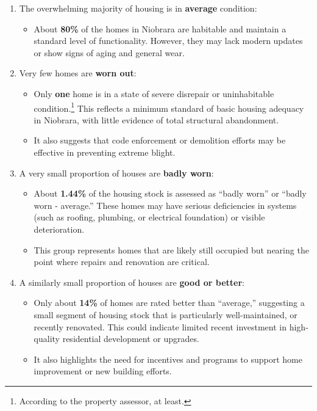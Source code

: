 \documentclass[
  letterpaper,
  DIV=11,
  numbers=noendperiod]{scrartcl}
\providecommand{\tightlist}{%
  \setlength{\itemsep}{0pt}\setlength{\parskip}{0pt}}
\begin{document}
\begin{enumerate}
\def\labelenumi{\arabic{enumi}.}
\tightlist
\item
  The overwhelming majority of housing is in \textbf{average} condition:

  \begin{itemize}
  \tightlist
  \item
    About \textbf{80\%} of the homes in Niobrara are habitable and
    maintain a standard level of functionality. However, they may lack
    modern updates or show signs of aging and general wear.
  \end{itemize}
\item
  Very few homes are \textbf{worn out}:

  \begin{itemize}
  \item
    Only \textbf{one} home is in a state of severe disrepair or
    uninhabitable condition.\footnote{According to the property
      assessor, at least.} This reflects a minimum standard of basic
    housing adequacy in Niobrara, with little evidence of total
    structural abandonment.
  \item
    It also suggests that code enforcement or demolition efforts may be
    effective in preventing extreme blight.
  \end{itemize}
\item
  A very small proportion of houses are \textbf{badly worn}:

  \begin{itemize}
  \item
    About \textbf{1.44\%} of the housing stock is assessed as ``badly
    worn'' or ``badly worn - average.'' These homes may have serious
    deficiencies in systems (such as roofing, plumbing, or electrical
    foundation) or visible deterioration.
  \item
    This group represents homes that are likely still occupied but
    nearing the point where repairs and renovation are critical.
  \end{itemize}
\item
  A similarly small proportion of houses are \textbf{good or better}:

  \begin{itemize}
  \item
    Only about \textbf{14\%} of homes are rated better than ``average,''
    suggesting a small segment of housing stock that is particularly
    well-maintained, or recently renovated. This could indicate limited
    recent investment in high-quality residential development or
    upgrades.
  \item
    It also highlights the need for incentives and programs to support
    home improvement or new building efforts.
  \end{itemize}
\end{enumerate}
\end{document}
